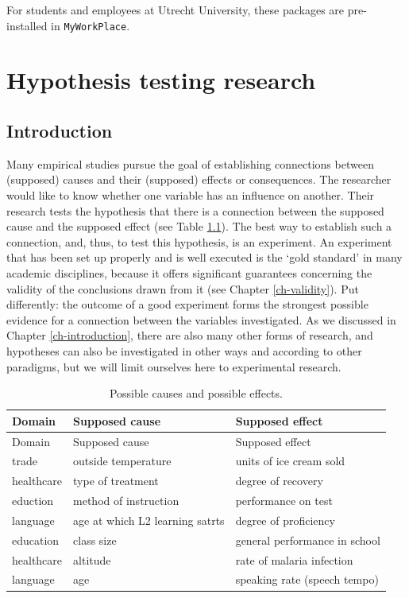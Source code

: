 \documentclass[
]{book}
\begin{document}
For students and employees at Utrecht University, these packages are pre-installed in \texttt{MyWorkPlace}.

\chapter{Hypothesis testing research}\label{ch-research}

\section{Introduction}\label{introduction}

Many empirical studies pursue the goal of establishing connections between (supposed) causes and their (supposed) effects or consequences. The researcher would like to know whether one variable has an influence on another. Their research tests the hypothesis that there is a connection between the supposed cause and the supposed effect (see Table \ref{tab:causeeffect}). The best way to establish such a connection, and, thus, to test this hypothesis, is an experiment. An experiment that has been set up properly and is well executed is the `gold standard' in many academic disciplines, because it offers significant guarantees concerning the validity of the conclusions drawn from it (see Chapter \ref{ch-validity}). Put differently: the outcome of a good experiment forms the strongest possible evidence for a connection between the variables investigated. As we discussed in Chapter \ref{ch-introduction}, there are also many other forms of research, and hypotheses can also be investigated in other ways and according to other paradigms, but we will limit ourselves here to experimental research.

\begin{longtable}[]{@{}lll@{}}
\caption{\label{tab:causeeffect} Possible causes and possible effects.}\tabularnewline
\toprule\noalign{}
Domain & Supposed cause & Supposed effect \\
\midrule\noalign{}
\endfirsthead
\toprule\noalign{}
Domain & Supposed cause & Supposed effect \\
\midrule\noalign{}
\endhead
\bottomrule\noalign{}
\endlastfoot
trade & outside temperature & units of ice cream sold \\
healthcare & type of treatment & degree of recovery \\
eduction & method of instruction & performance on test \\
language & age at which L2 learning satrts & degree of proficiency \\
education & class size & general performance in school \\
healthcare & altitude & rate of malaria infection \\
language & age & speaking rate (speech tempo) \\
\end{longtable}
\end{document}
